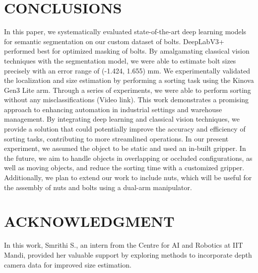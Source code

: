 \documentclass[letterpaper, 10 pt, conference]{ieeeconf}  %
\begin{document}
\section{CONCLUSIONS}
In this paper, we systematically evaluated state-of-the-art deep learning models for semantic segmentation on our custom dataset of bolts. DeepLabV3+ performed best for optimized masking of bolts. By amalgamating classical vision techniques with the segmentation model, we were able to estimate bolt sizes precisely with an error range of (-1.424, 1.655) mm. We experimentally validated the localization and size estimation by performing a sorting task using the Kinova Gen3 Lite arm. Through a series of experiments, we were able to perform sorting without any misclassifications (Video link). This work demonstrates a promising approach to enhancing automation in industrial settings and warehouse management. By integrating deep learning and classical vision techniques, we provide a solution that could potentially improve the accuracy and efficiency of sorting tasks, contributing to more streamlined operations. In our present experiment, we assumed the object to be static and used an in-built gripper. In the future, we aim to handle objects in overlapping or occluded configurations, as well as moving objects, and reduce the sorting time with a customized gripper. Additionally, we plan to extend our work to include nuts, which will be useful for the assembly of nuts and bolts using a dual-arm manipulator.
\section*{ACKNOWLEDGMENT}
In this work, Smrithi S., an intern from the Centre for AI and Robotics at IIT Mandi, provided her valuable support by exploring methods to incorporate depth camera data for improved size estimation.


\end{document}
